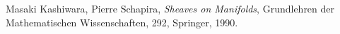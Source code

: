 \begin{comment}
\section{層}
層の一番身近な例は連続関数や微分可能関数，正則関数の層であろう．
\begin{Example}
    \begin{enumerate}
        \item 連続関数
        \item 微分可能関数
        \item 正則関数の層：\(X\)を複素多様体とする．
        \(X\)の開集合\(U\)に対し，\[
            \OO_X(U)\coloneqq\{U\text{上の正則関数}\}
        \]とおく．
    \end{enumerate}
\end{Example}
\end{comment}
\begin{thebibliography}{20} 
     Masaki Kashiwara, Pierre Schapira, 
    \textit{Sheaves on Manifolds}, 
    Grundlehren der Mathematischen Wissenschaften, 292, Springer, 1990.
\end{thebibliography}




